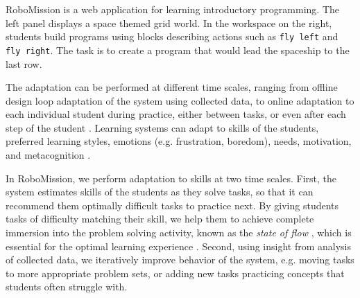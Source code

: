 
%
  {RoboMission is a web application for learning introductory programming.
   The left panel displays a space themed grid world. In the workspace on
   the right, students build programs using blocks describing actions
   such as \texttt{fly left} and \texttt{fly right}.
   The task is to create a program that would lead the spaceship to the last row.}

The adaptation can be performed at different time scales,
ranging from offline design loop adaptation of the system using
collected data, to online adaptation to each individual student during practice,
either between tasks, or even after each step of the student
\cite{adaptive-learning-grid}.
Learning systems can adapt to skills of the students, preferred learning styles,
emotions (e.g. frustration, boredom), needs, motivation, and metacognition
\cite[ch.\,10]{affect-sensor-free,its-review-2010}.

In RoboMission, we perform adaptation to skills at two time scales.
First, the system estimates skills of the students as they solve tasks,
so that it can recommend them optimally difficult tasks to practice next.
By giving students tasks of difficulty matching their skill,
we help them to achieve complete immersion into the problem solving
activity, known as  %
the \emph{state of flow} \cite{flow},
which is essential for the optimal learning experience
\cite{adaptive-practice}.
Second, using insight from analysis of collected data,
we iteratively improve behavior of the system,
e.g. moving tasks to more appropriate problem sets,
or adding new tasks practicing concepts that students often struggle with.



